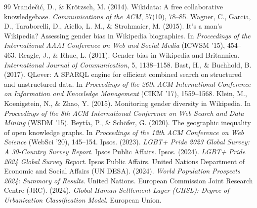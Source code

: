 \documentclass[11pt,a4paper]{article}
\begin{document}
\begin{thebibliography}{99}
 Vrande\v{c}i\'{c}, D., \& Kr\"{o}tzsch, M. (2014). Wikidata: A free collaborative knowledgebase. \textit{Communications of the ACM}, 57(10), 78--85.
 Wagner, C., Garcia, D., Taraborelli, D., Aiello, L. M., \& Strohmaier, M. (2015). It's a man's Wikipedia? Assessing gender bias in Wikipedia biographies. In \textit{Proceedings of the International AAAI Conference on Web and Social Media} (ICWSM '15), 454--463.
 Reagle, J., \& Rhue, L. (2011). Gender bias in Wikipedia and Britannica. \textit{International Journal of Communication}, 5, 1138--1158.
 Bast, H., \& Buchhold, B. (2017). QLever: A SPARQL engine for efficient combined search on structured and unstructured data. In \textit{Proceedings of the 26th ACM International Conference on Information and Knowledge Management} (CIKM '17), 1559--1568.
 Klein, M., Koenigstein, N., \& Zhao, Y. (2015). Monitoring gender diversity in Wikipedia. In \textit{Proceedings of the 8th ACM International Conference on Web Search and Data Mining} (WSDM '15).
 Beyt\'ia, P., \& Sch\"ofer, G. (2020). The geographic inequality of open knowledge graphs. In \textit{Proceedings of the 12th ACM Conference on Web Science} (WebSci '20), 145--154.
 Ipsos. (2023). \textit{LGBT+ Pride 2023 Global Survey: A 30-Country Survey Report}. Ipsos Public Affairs.
 Ipsos. (2024). \textit{LGBT+ Pride 2024 Global Survey Report}. Ipsos Public Affairs.
 United Nations Department of Economic and Social Affairs (UN DESA). (2024). \textit{World Population Prospects 2024: Summary of Results}. United Nations.
 European Commission Joint Research Centre (JRC). (2024). \textit{Global Human Settlement Layer (GHSL): Degree of Urbanization Classification Model}. European Union.
\end{thebibliography}
\end{document}
